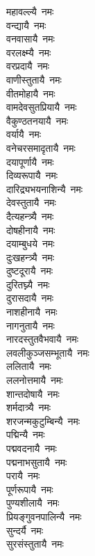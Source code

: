 \begin{flushleft}
\begin{multicols}{2}
महावल्ल्यै~नमः\\
वन्द्यायै~नमः\\
वनवासायै~नमः\\
वरलक्ष्म्यै~नमः\\
वरप्रदायै~नमः\\
वाणीस्तुतायै~नमः\\
वीतमोहायै~नमः\\
वामदेवसुतप्रियायै~नमः\\
वैकुण्ठतनयायै~नमः\\
वर्यायै~नमः\hfill{}\\
वनेचरसमादृतायै~नमः\\
दयापूर्णायै~नमः\\
दिव्यरूपायै~नमः\\
दारिद्र्यभयनाशिन्यै~नमः\\
देवस्तुतायै~नमः\\
दैत्यहन्त्र्यै~नमः\\
दोषहीनायै~नमः\\
दयाम्बुधये~नमः\\
दुःखहन्त्र्यै~नमः\\
दुष्टदूरायै~नमः\hfill{}\\
दुरितघ्न्यै~नमः\\
दुरासदायै~नमः\\
नाशहीनायै~नमः\\
नागनुतायै~नमः\\
नारदस्तुतवैभवायै~नमः\\
लवलीकुञ्जसम्भूतायै~नमः\\
ललितायै~नमः\\
ललनोत्तमायै~नमः\\
शान्तदोषायै~नमः\\
शर्मदात्र्यै~नमः\hfill{}\\
शरजन्मकुटुम्बिन्यै~नमः\\
पद्मिन्यै~नमः\\
पद्मवदनायै~नमः\\
पद्मनाभसुतायै~नमः \\
परायै~नमः\\
पूर्णरूपायै~नमः\\
पुण्यशीलायै~नमः\\
प्रियङ्गुवनपालिन्यै~नमः\\
सुन्दर्यै~नमः\\
सुरसंस्तुतायै~नमः\hfill{}\\

\end{multicols}
\end{flushleft}
